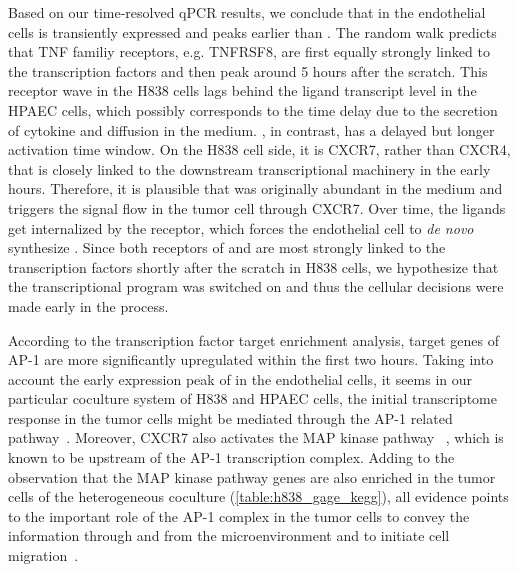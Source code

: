 Based on our time-resolved qPCR results, we conclude that \tnfa in the endothelial 
cells is 
transiently expressed and peaks earlier than \sdfonea.
The random walk predicts that TNF familiy receptors, e.g.
TNFRSF8, are first equally strongly linked to
the transcription factors and then peak around 5 hours after the scratch. This receptor
wave in the H838 cells lags behind the ligand transcript level in the HPAEC cells,
which possibly corresponds to the time delay due to the 
secretion of cytokine and diffusion in the medium.
\sdfonea, in contrast, has
a delayed but longer activation time window. 
On the H838 cell side, it is CXCR7, rather than CXCR4, that
is closely linked to the downstream transcriptional machinery
in the early hours. Therefore, it is plausible that \sdfonea
was originally abundant in the medium and triggers the 
signal flow in the tumor cell through CXCR7. 
Over time, the ligands get
internalized by the receptor, 
which forces the endothelial cell to 
\emph{de novo} synthesize \sdfonea. Since both receptors of
\tnfa and
\sdfonea are most strongly linked to the transcription
factors shortly after the scratch in H838 cells, we hypothesize
that the transcriptional program was switched on and thus the
cellular decisions were made early in the process.


According to the transcription factor target enrichment analysis, target genes
of AP-1 are more significantly upregulated within the first two hours. 
Taking into account
the early expression peak of \tnfa in the endothelial cells, it seems
in our particular coculture system of H838 and HPAEC cells, the initial 
transcriptome response in the tumor cells might be mediated through the AP-1
related pathway~\citep{Kulbe2005}. 
Moreover, CXCR7 also activates the MAP kinase pathway%
~\citep{Rajagopal2010a},
which is 
known to be upstream of the AP-1 transcription complex.
Adding to the observation that the MAP kinase pathway genes are also enriched 
in the tumor cells of the heterogeneous coculture 
(\ref{table:h838_gage_kegg}), 
all evidence points to the important role of the
AP-1 complex in the tumor cells to convey the information 
through \tnfa and \sdfonea from the microenvironment and to initiate cell
migration~\citep{Busch2008,Singh2012}.

